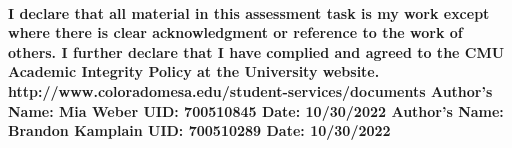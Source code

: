 \documentclass{article}
\begin{document}
\paragraph{\linebreak I declare that all material in this assessment task is my work except where there is clear acknowledgment or reference to the work of others. I further declare that I have complied and agreed to the CMU Academic Integrity Policy at the University website.
\linebreak  http://www.coloradomesa.edu/student-services/documents
\linebreak \linebreak Author’s Name: Mia Weber UID: 700510845 Date: 10/30/2022
\linebreak Author's Name: Brandon Kamplain UID: 700510289 Date: 10/30/2022}
\end{document}
